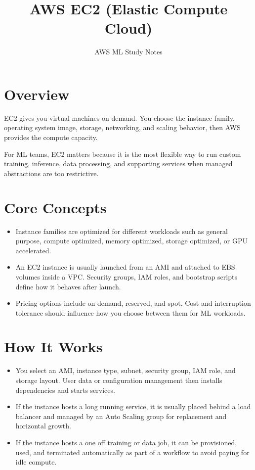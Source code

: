 \documentclass[10pt,twocolumn]{article}
\begin{document}
\title{\vspace{-1.6cm}AWS EC2 (Elastic Compute Cloud)}
\author{AWS ML Study Notes}
\date{}
\maketitle
\small

\section*{Overview}
EC2 gives you virtual machines on demand. You choose the instance family, operating system image, storage, networking, and scaling behavior, then AWS provides the compute capacity.

For ML teams, EC2 matters because it is the most flexible way to run custom training, inference, data processing, and supporting services when managed abstractions are too restrictive.

\section*{Core Concepts}
\begin{itemize}
\item Instance families are optimized for different workloads such as general purpose, compute optimized, memory optimized, storage optimized, or GPU accelerated.
\item An EC2 instance is usually launched from an AMI and attached to EBS volumes inside a VPC. Security groups, IAM roles, and bootstrap scripts define how it behaves after launch.
\item Pricing options include on demand, reserved, and spot. Cost and interruption tolerance should influence how you choose between them for ML workloads.
\end{itemize}

\section*{How It Works}
\begin{itemize}
\item You select an AMI, instance type, subnet, security group, IAM role, and storage layout. User data or configuration management then installs dependencies and starts services.
\item If the instance hosts a long running service, it is usually placed behind a load balancer and managed by an Auto Scaling group for replacement and horizontal growth.
\item If the instance hosts a one off training or data job, it can be provisioned, used, and terminated automatically as part of a workflow to avoid paying for idle compute.
\end{itemize}
\end{document}
